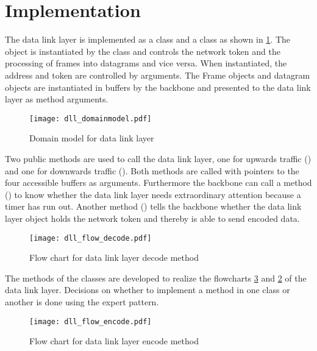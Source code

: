 \section{Implementation}
The data link layer is implemented as a  class and a
 class as shown in \ref{fig:class_diag_for_datalink}. The
 object is instantiated by the  class and
controls the network token and the processing of frames into datagrams and vice
versa. When instantiated, the address and token are controlled by arguments. The
Frame objects and datagram objects are instantiated in buffers by the backbone
and presented to the data link layer as method arguments.

\begin{figure}[htb]
	\centering
	\texttt{[image: dll\_domainmodel.pdf]}
	\caption{Domain model for data link layer}
	\label{fig:class_diag_for_datalink}	
\end{figure}

Two public methods are used to call the data link layer, one for upwards traffic
() and one for downwards traffic (). Both methods are called with
pointers to the four accessible buffers as arguments. Furthermore the backbone
can call a method () to know whether the data link layer needs
extraordinary attention because a timer has run out. Another method
() tells the backbone whether the data link layer object holds the
network token and thereby is able to send encoded data.

\begin{figure}[htb]
	\centering
	\texttt{[image: dll\_flow\_decode.pdf]}
	\caption{Flow chart for data link layer decode method}
	\label{fig:dll_flow_decode}	
\end{figure}

The methods of the classes are developed to realize the
flowcharts \ref{fig:dll_flow_encode} and
\ref{fig:dll_flow_decode} of the data link layer. Decisions on whether to implement a method in one class or another is done using the expert pattern.

\begin{figure}[htb]
	\begin{center}
	\texttt{[image: dll\_flow\_encode.pdf]}
	\caption{Flow chart for data link layer encode method}
	\label{fig:dll_flow_encode}	
	\end{center}
\end{figure}

